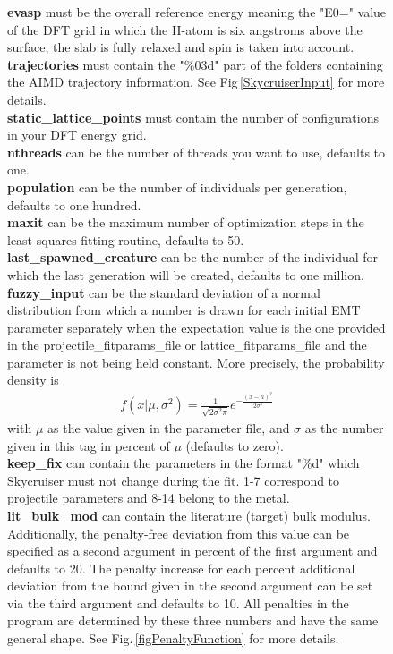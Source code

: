 \documentclass[twoside, 11pt, titlepage, captions=nooneline, a4paper, headsepline]{scrbook}%
\newcommand{\9}{\mathrm}
\newcommand{\0}{\,\mathrm}
\begin{document}
\begin{figure}[b!]
\textbf{evasp} must be the overall reference energy meaning the "E0=" value of the DFT grid in which the H-atom is six angstroms above the surface, the slab is fully relaxed and spin is taken into account.\\ 
\textbf{trajectories} must contain the "\%03d" part of the folders containing the AIMD trajectory information. See Fig\,\ref{SkycruiserInput} for more details.\\
\textbf{static\_lattice\_points} must contain the number of configurations in your DFT energy grid.\\
\textbf{nthreads} can be the number of threads you want to use, defaults to one.\\
\textbf{population} can be the number of individuals per generation, defaults to one hundred.\\
\textbf{maxit} can be the maximum number of optimization steps in the least squares fitting routine, defaults to 50.\\
\textbf{last\_spawned\_creature} can be the number of the individual for which the last generation will be created, defaults to one million.\\
\textbf{fuzzy\_input} can be the standard deviation of a normal distribution from which a number is drawn for each initial EMT parameter separately when the expectation value is the one provided in the projectile\_fitparams\_file or lattice\_fitparams\_file and the parameter is not being held constant. More precisely, the probability density is
\begin{align*}
  f(x|\mu,\sigma^2) = \frac{1}{\sqrt{2\sigma^2\pi}}e^{-\frac{(x-\mu)^2}{2\sigma^2}}
\end{align*}
with $\mu$ as the value given in the parameter file, and $\sigma$ as the number given in this tag in percent of $\mu$ (defaults to zero).\\
\textbf{keep\_fix} can contain the parameters in the format "\%d" which Skycruiser must not change during the fit. 1-7 correspond to projectile parameters and 8-14 belong to the metal.\\ 
\textbf{lit\_bulk\_mod} can contain the literature (target) bulk modulus. Additionally, the penalty-free deviation from this value can be specified as a second argument in percent of the first argument and defaults to 20. The penalty increase for each percent additional deviation from the bound given in the second argument can be set via the third argument and defaults to 10. All penalties in the program are determined by these three numbers and have the same general shape. See Fig.\,\ref{figPenaltyFunction} for more details.\\

\end{figure}
\end{document}
